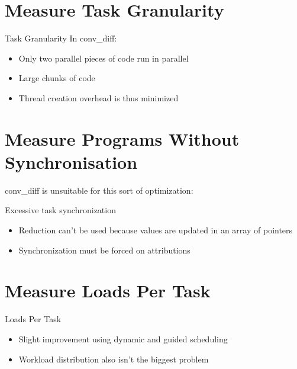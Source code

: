 \documentclass{beamer}
\begin{document}
\section{Measure Task Granularity}

\begin{frame}[fragile]
	\begin{block}{Task Granularity}
		In conv\_diff:									
		\begin{itemize}
			\item Only two parallel pieces of code run in parallel
			\item Large chunks of code
			\item Thread creation overhead is thus minimized 
		\end{itemize}
	\end{block}
\end{frame}

\section{Measure Programs Without Synchronisation}

\begin{frame}[fragile]

	{conv}\_diff is unsuitable for this sort of optimization:
	\begin{block}{Excessive task synchronization}		
		\begin{itemize}
			\item Reduction can't be used because values are updated in an array of pointers
			\item Synchronization must be forced on attributions
		\end{itemize}
	\end{block}
\end{frame}

\section{Measure Loads Per Task}

\begin{frame}[fragile]
	
	\begin{block}{Loads Per Task}
		\begin{itemize}
			\item Slight improvement using dynamic and guided scheduling
			\item Workload distribution also isn't the biggest problem
		\end{itemize}
	\end{block}

\end{frame}
\end{document}
